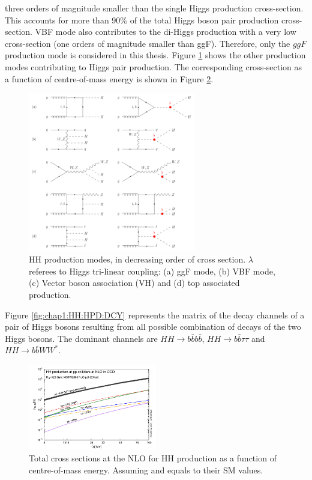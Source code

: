 three orders of magnitude smaller than the single Higgs production cross-section. This accounts for more than 90\% of the total Higgs boson pair production cross-section. VBF mode also contributes to the di-Higgs production with a very low cross-section (one orders of magnitude smaller than ggF). Therefore, only the $ggF$ production mode is considered in this thesis. Figure \ref{fig:chap1:HH:HPD:FYS} shows the other production modes contributing to Higgs pair production. The corresponding cross-section as a function of centre-of-mass energy is shown in Figure \ref{fig:chap1:HH:BSM:XSEC:S}. \\
\begin{figure}[htbp]
    \centering
    \includegraphics[width=0.65\textwidth]{Ch1/Img/HH_feyns.png}
    \caption{HH production modes, in decreasing order of cross section. $\lambda$ referees to Higgs tri-linear coupling: (a) ggF mode, (b) VBF mode, (c) Vector boson association (VH) and (d) top associated production.}
    \label{fig:chap1:HH:HPD:FYS}
\end{figure}
Figure \ref{fig:chap1:HH:HPD:DCY} represents the matrix of the decay channels of a pair of Higgs bosons resulting from all possible combination of decays of the two Higgs bosons. The dominant channels are $HH\rightarrow b\bar{b}b\bar{b}$, $HH\rightarrow b\bar{b}\tau\tau$ and $HH\rightarrow b\bar{b}WW^*$.
\begin{figure}[htbp]
    \centering
    \includegraphics[width=0.5\textwidth]{Ch1/Img/HH_XSec_as_S.png}
    \caption{Total cross sections at the NLO for HH production as a function of centre-of-mass energy. Assuming \kl and \kt equals to their SM values.}
    \label{fig:chap1:HH:BSM:XSEC:S}
\end{figure}
